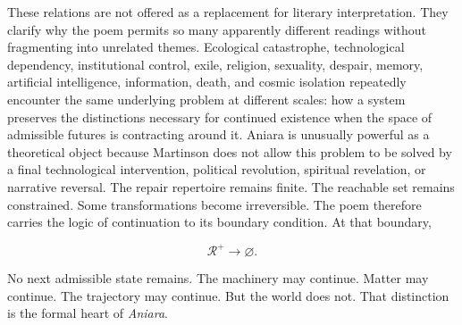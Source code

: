 \documentclass[11pt,oneside]{book}
\theoremstyle{definition}
\theoremstyle{remark}
\begin{document}
These relations are not offered as a replacement for literary interpretation. They clarify why the
poem permits so many apparently different readings without fragmenting into unrelated themes.
Ecological catastrophe, technological dependency, institutional control, exile, religion, sexuality,
despair, memory, artificial intelligence, information, death, and cosmic isolation repeatedly
encounter the same underlying problem at different scales: how a system preserves the distinctions
necessary for continued existence when the space of admissible futures is contracting around it.
Aniara is unusually powerful as a theoretical object because Martinson does not allow this problem
to be solved by a final technological intervention, political revolution, spiritual revelation, or
narrative reversal. The repair repertoire remains finite. The reachable set remains constrained.
Some transformations become irreversible. The poem therefore carries the logic of continuation to
its boundary condition. At that boundary,

\[
\mathcal{R}^{+}\rightarrow\varnothing.
\]

No next admissible state remains. The machinery may continue. Matter may continue. The trajectory
may continue. But the world does not. That distinction is the formal heart of \emph{Aniara}.
\end{document}
